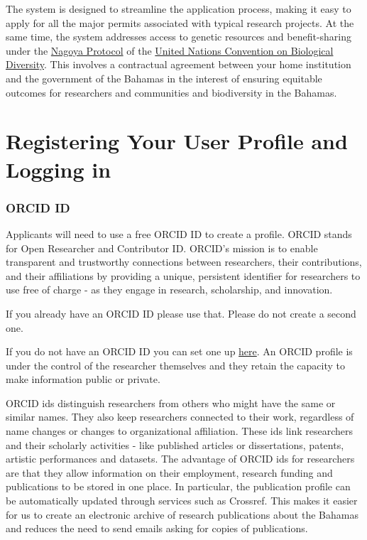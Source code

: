 \documentclass[
]{book}
\begin{document}
The system is designed to streamline the application process, making it easy to apply for all the major permits associated with typical research projects. At the same time, the system addresses access to genetic resources and benefit-sharing under the \href{https://www.cbd.int/abs/}{Nagoya Protocol} of the \href{https://www.cbd.int/}{United Nations Convention on Biological Diversity}. This involves a contractual agreement between your home institution and the government of the Bahamas in the interest of ensuring equitable outcomes for researchers and communities and biodiversity in the Bahamas.

\hypertarget{registering-your-user-profile-and-logging-in}{%
\chapter*{Registering Your User Profile and Logging in}\label{registering-your-user-profile-and-logging-in}}

\hypertarget{orcid-id}{%
\subsection{ORCID ID}\label{orcid-id}}

Applicants will need to use a free ORCID ID to create a profile. ORCID stands for Open Researcher and Contributor ID. ORCID's mission is to enable transparent and trustworthy connections between researchers, their contributions, and their affiliations by providing a unique, persistent identifier for researchers to use free of charge - as they engage in research, scholarship, and innovation.

If you already have an ORCID ID please use that. Please do not create a second one.

If you do not have an ORCID ID you can set one up \href{https://orcid.org/}{here}. An ORCID profile is under the control of the researcher themselves and they retain the capacity to make information public or private.

ORCID ids distinguish researchers from others who might have the same or similar names. They also keep researchers connected to their work, regardless of name changes or changes to organizational affiliation. These ids link researchers and their scholarly activities - like published articles or dissertations, patents, artistic performances and datasets. The advantage of ORCID ids for researchers are that they allow information on their employment, research funding and publications to be stored in one place. In particular, the publication profile can be automatically updated through services such as Crossref. This makes it easier for us to create an electronic archive of research publications about the Bahamas and reduces the need to send emails asking for copies of publications.
\end{document}
